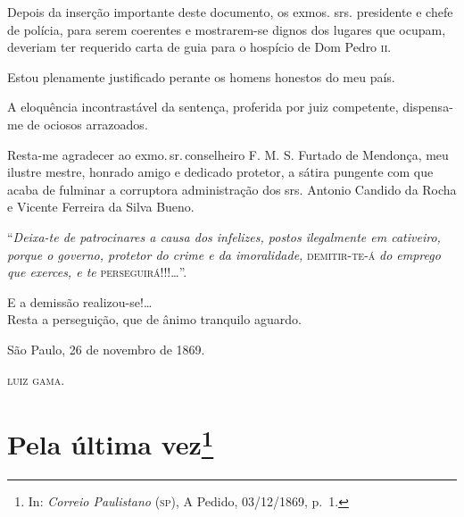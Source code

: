 Depois da inserção importante deste documento, os exmos. srs. presidente
e chefe de polícia, para serem coerentes e mostrarem-se dignos dos
lugares que ocupam, deveriam ter requerido carta de guia para o hospício
de Dom Pedro \textsc{ii}.

Estou plenamente justificado perante os homens honestos do meu país.

A eloquência incontrastável da sentença, proferida por juiz competente,
dispensa-me de ociosos arrazoados.

Resta-me agradecer ao exmo.\,sr.\,conselheiro F. M. S. Furtado de
Mendonça, meu ilustre mestre, honrado amigo e dedicado protetor, a
sátira pungente com que acaba de fulminar a corruptora administração dos
srs. Antonio Candido da Rocha e Vicente Ferreira da Silva Bueno.

``\emph{Deixa-te de patrocinares a causa dos infelizes, postos
ilegalmente em cativeiro, porque o governo, protetor do crime e da
imoralidade,} \textsc{demitir-te-á} \emph{do emprego que exerces, e te}
\textsc{perseguirá}!!!\ldots{}''.

E a demissão realizou-se!\ldots{}\\
Resta a perseguição, que de ânimo tranquilo aguardo.

São Paulo, 26 de novembro de 1869.

\textsc{luiz gama}.

\chapter{Pela última vez\footnote{In: \emph{Correio Paulistano} (\textsc{sp}), A
  Pedido, 03/12/1869, p.~1.}}

